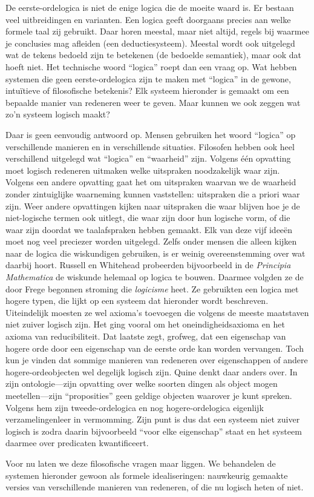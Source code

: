 \documentclass[../../../include/open-logic-section]{subfiles}
\begin{document}


De eerste-ordelogica is niet de enige logica die de moeite waard is.
Er bestaan veel uitbreidingen en varianten. Een logica geeft doorgaans
precies aan welke formele taal zij gebruikt. Daar horen meestal, maar
niet altijd, regels bij waarmee je conclusies mag afleiden (een
deductiesysteem). Meestal wordt ook uitgelegd wat de tekens bedoeld zijn
te betekenen (de bedoelde semantiek), maar ook dat hoeft niet. Het
technische woord ``logica'' roept dan een vraag op. Wat hebben systemen
die geen eerste-ordelogica zijn te maken met ``logica'' in de gewone,
intuïtieve of filosofische betekenis? Elk systeem hieronder is gemaakt
om een bepaalde manier van redeneren weer te geven. Maar kunnen we ook
zeggen wat zo'n systeem logisch maakt?

Daar is geen eenvoudig antwoord op. Mensen gebruiken het woord
``logica'' op verschillende manieren en in verschillende situaties.
Filosofen hebben ook heel verschillend uitgelegd wat ``logica'' en
``waarheid'' zijn. Volgens één opvatting moet logisch redeneren uitmaken
welke uitspraken noodzakelijk waar zijn. Volgens een andere opvatting
gaat het om uitspraken waarvan we de waarheid zonder zintuiglijke
waarneming kunnen vaststellen: uitspraken die a priori waar zijn. Weer
andere opvattingen kijken naar uitspraken die waar blijven hoe je de
niet-logische termen ook uitlegt, die waar zijn door hun logische vorm,
of die waar zijn doordat we taalafspraken hebben gemaakt. Elk van deze
vijf ideeën moet nog veel preciezer worden uitgelegd. Zelfs onder
mensen die alleen kijken naar de logica die wiskundigen gebruiken, is
er weinig overeenstemming over wat daarbij hoort. Russell en Whitehead
probeerden bijvoorbeeld in de \textit{Principia Mathematica} de
wiskunde helemaal op logica te bouwen. Daarmee volgden ze de door Frege
begonnen stroming die {\em logicisme} heet. Ze gebruikten een logica met
hogere typen, die lijkt op een systeem dat hieronder wordt beschreven.
Uiteindelijk moesten ze wel axioma's toevoegen die volgens de meeste
maatstaven niet zuiver logisch zijn. Het ging vooral om het
oneindigheidsaxioma en het axioma van reducibiliteit. Dat laatste zegt,
grofweg, dat een eigenschap van hogere orde door een eigenschap van de
eerste orde kan worden vervangen. Toch kun je vinden dat sommige
manieren van redeneren over eigenschappen of andere hogere-ordeobjecten
wel degelijk logisch zijn. Quine denkt daar anders over. In zijn
ontologie---zijn opvatting over welke soorten dingen als object mogen
meetellen---zijn ``proposities'' geen geldige objecten waarover je kunt
spreken. Volgens hem zijn tweede-ordelogica en nog hogere-ordelogica
eigenlijk verzamelingenleer in vermomming. Zijn punt is dus dat een
systeem niet zuiver logisch is zodra daarin bijvoorbeeld ``voor elke
eigenschap'' staat en het systeem daarmee over predicaten
kwantificeert.

Voor nu laten we deze filosofische vragen maar liggen. We behandelen de
systemen hieronder gewoon als formele idealiseringen: nauwkeurig
gemaakte versies van verschillende manieren van redeneren, of die nu
logisch heten of niet.
\end{document}
